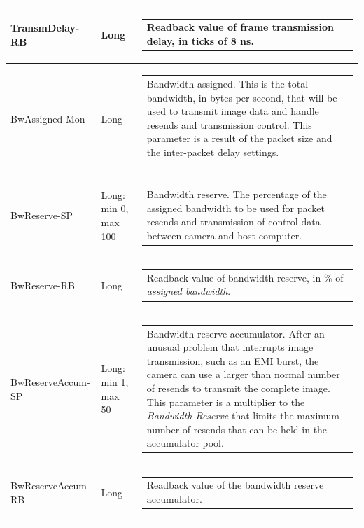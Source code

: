 \documentclass[openany]{article}
\begin{document}
\begin{longtable}{| m{3.0cm} m{4.5cm}  m{7.0cm} |}
        TransmDelay-RB & Long & \begin{tabular}{@{}m{6cm}@{}}
                Readback value of frame transmission delay, in ticks of 8 ns.
            \end{tabular} \hypertarget{pv:bw-assigned}{}\\ \hline
        BwAssigned-Mon & Long & \begin{tabular}{@{}m{6cm}@{}}
                Bandwidth assigned. This is the total bandwidth, in bytes per second, that will be used to transmit image data and handle resends and transmission control. This parameter is a result of the packet size and the inter-packet delay settings.
            \end{tabular} \hypertarget{pv:bw-reserve}{}\\ \hline
        BwReserve-SP & Long: min 0, max 100 & \begin{tabular}{@{}m{6cm}@{}}
                Bandwidth reserve. The percentage of the assigned bandwidth to be used for packet resends and transmission of control data between camera and host computer.
            \end{tabular} \\ \hline
        BwReserve-RB & Long & \begin{tabular}{@{}m{6cm}@{}}
                Readback value of bandwidth reserve, in \% of \emph{assigned bandwidth}.
            \end{tabular} \hypertarget{pv:bw-reserve-accum}{}\\ \hline
        BwReserveAccum-SP & Long: min 1, max 50 & \begin{tabular}{@{}m{6cm}@{}}
                Bandwidth reserve accumulator. After an unusual problem that interrupts image transmission, such as an EMI burst, the camera can use a larger than normal number of resends to transmit the complete image. This parameter is a multiplier to the \emph{Bandwidth Reserve} that limits the maximum number of resends that can be held in the accumulator pool.
            \end{tabular} \\ \hline
        BwReserveAccum-RB & Long & \begin{tabular}{@{}m{6cm}@{}}
                Readback value of the bandwidth reserve accumulator.
            \end{tabular} \hypertarget{pv:frame-max-jitter}{}\\ \hline

\end{longtable}
\end{document}
